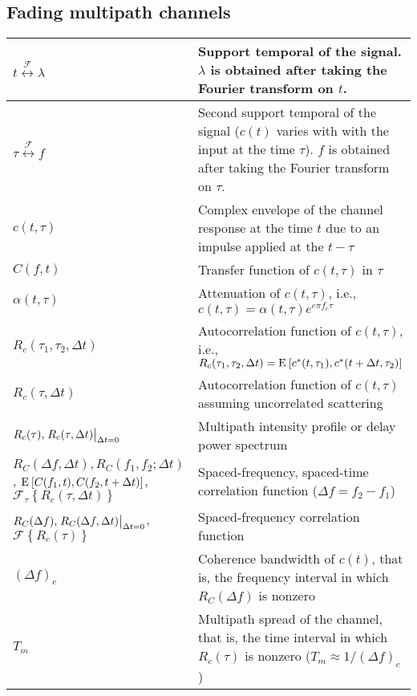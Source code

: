 \documentclass{article}
\begin{document}
\subsection{Fading multipath channels}
\begin{xltabular}{\textwidth}{XX}
    \(t \overset{\mathcal{F}}{\leftrightarrow} \lambda\) & Support temporal of the signal. \(\lambda\) is obtained after taking the Fourier transform on \(t\). \\ \hline
    \(\tau \overset{\mathcal{F}}{\leftrightarrow} f\) & Second support temporal of the signal (\(c(t)\) varies with with the input at the time \(\tau\)). \(f\) is obtained after taking the Fourier transform on \(\tau\). \\ \hline
    \(c(t, \tau)\) & Complex envelope of the channel response at the time \(t\) due to an impulse applied at the \(t - \tau\) \\ \hline
    \(C(f,t)\) & Transfer function of \(c(t, \tau)\) in \(\tau\) \\ \hline
    \(\alpha(t, \tau)\) & Attenuation of \(c(t, \tau)\), i.e., \(c(t, \tau) = \alpha(t, \tau) e^{e\pi f_c \tau}\) \\ \hline
    \(R_c(\tau_1, \tau_2, \Delta t)\) & Autocorrelation function of \(c(t, \tau)\), i.e., \(R_c(\tau_1, \tau_2, \Delta t) = \E{c^*(t, \tau_1), c^*(t + \Delta t, \tau_2)}\) \\ \hline
    \(R_c(\tau, \Delta t)\) & Autocorrelation function of \(c(t, \tau)\) assuming uncorrelated scattering \\ \hline
    \(R_c(\tau), \eval{R_c(\tau, \Delta t)}_{\Delta t = 0}\) & Multipath intensity profile or delay power spectrum \\ \hline
    \(R_C(\Delta f, \Delta t), R_C(f_1, f_2; \Delta t)\), \(\E{C(f_1,t), C(f_2, t + \Delta t)}\), \(\mathcal{F}_\tau \left\{ R_c(\tau, \Delta t) \right\}\) &  Spaced-frequency, spaced-time correlation function (\(\Delta f = f_2 - f_1\)) \\ \hline
    \(R_C(\Delta f), \eval{R_C(\Delta f, \Delta t)}_{\Delta t = 0}\), \(\mathcal{F}\left\{ R_c(\tau) \right\}\) & Spaced-frequency correlation function \\ \hline
    \((\Delta f)_c\) & Coherence bandwidth of \(c(t)\), that is, the frequency interval in which \(R_C(\Delta f)\) is nonzero \\ \hline
    \(T_m\) & Multipath spread of the channel, that is, the time interval in which \(R_c(\tau)\) is nonzero (\(T_m \approx 1/(\Delta f)_c \)) \\ \hline

\end{xltabular}
\end{document}
